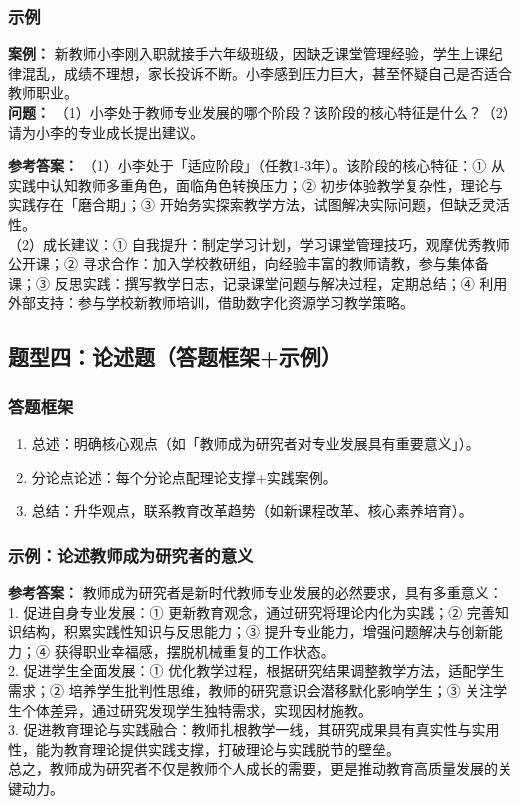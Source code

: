 \documentclass[12pt,a4paper]{article}
\begin{document}
\subsubsection{示例}
\textbf{案例：} 新教师小李刚入职就接手六年级班级，因缺乏课堂管理经验，学生上课纪律混乱，成绩不理想，家长投诉不断。小李感到压力巨大，甚至怀疑自己是否适合教师职业。\\
\textbf{问题：} （1）小李处于教师专业发展的哪个阶段？该阶段的核心特征是什么？（2）请为小李的专业成长提出建议。

\textbf{参考答案：}
（1）小李处于「适应阶段」（任教1-3年）。该阶段的核心特征：① 从实践中认知教师多重角色，面临角色转换压力；② 初步体验教学复杂性，理论与实践存在「磨合期」；③ 开始务实探索教学方法，试图解决实际问题，但缺乏灵活性。\\
（2）成长建议：① 自我提升：制定学习计划，学习课堂管理技巧，观摩优秀教师公开课；② 寻求合作：加入学校教研组，向经验丰富的教师请教，参与集体备课；③ 反思实践：撰写教学日志，记录课堂问题与解决过程，定期总结；④ 利用外部支持：参与学校新教师培训，借助数字化资源学习教学策略。

\subsection{题型四：论述题（答题框架+示例）}
\subsubsection{答题框架}
\begin{enumerate}[label=•,itemsep=0.3ex]
\item 总述：明确核心观点（如「教师成为研究者对专业发展具有重要意义」）。
\item 分论点论述：每个分论点配理论支撑+实践案例。
\item 总结：升华观点，联系教育改革趋势（如新课程改革、核心素养培育）。
\end{enumerate}

\subsubsection{示例：论述教师成为研究者的意义}
\textbf{参考答案：}
教师成为研究者是新时代教师专业发展的必然要求，具有多重意义：\\
1. 促进自身专业发展：① 更新教育观念，通过研究将理论内化为实践；② 完善知识结构，积累实践性知识与反思能力；③ 提升专业能力，增强问题解决与创新能力；④ 获得职业幸福感，摆脱机械重复的工作状态。\\
2. 促进学生全面发展：① 优化教学过程，根据研究结果调整教学方法，适配学生需求；② 培养学生批判性思维，教师的研究意识会潜移默化影响学生；③ 关注学生个体差异，通过研究发现学生独特需求，实现因材施教。\\
3. 促进教育理论与实践融合：教师扎根教学一线，其研究成果具有真实性与实用性，能为教育理论提供实践支撑，打破理论与实践脱节的壁垒。\\
总之，教师成为研究者不仅是教师个人成长的需要，更是推动教育高质量发展的关键动力。
\end{document}
